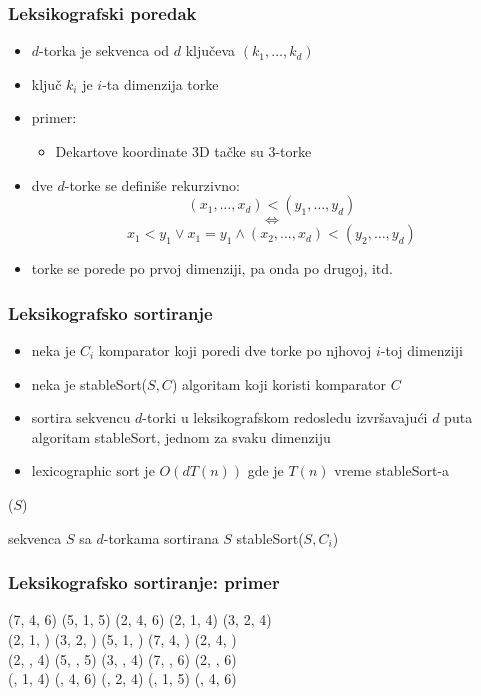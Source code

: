 \documentclass[compress,aspectratio=169]{beamer}
\begin{document}
\begin{frame}
  \frametitle{Leksikografski poredak}
  \begin{itemize}
    \item $d$-torka je sekvenca od $d$ ključeva $(k_1,\ldots,k_d)$
    \item ključ $k_i$ je $i$-ta dimenzija torke
    \item primer:
    \begin{itemize}
      \item Dekartove koordinate 3D tačke su 3-torke
    \end{itemize}
    \item {} dve $d$-torke se definiše rekurzivno:
    $$(x_1,\ldots,x_d) < (y_1,\ldots,y_d) $$
    $$\Leftrightarrow$$ 
    $$x_1 < y_1 \lor x_1 = y_1 \land (x_2,\ldots,x_d)<(y_2,\ldots,y_d)$$
    \item torke se porede po prvoj dimenziji, pa onda po drugoj, itd.
  \end{itemize}
\end{frame}

\begin{frame}
  \frametitle{Leksikografsko sortiranje}
  \begin{itemize}
    \item neka je $C_i$ komparator koji poredi dve torke po njhovoj $i$-toj dimenziji
    \item neka je stableSort($S, C$) algoritam koji koristi komparator $C$
    \item {} sortira sekvencu $d$-torki u leksikografskom redosledu izvršavajući $d$ puta algoritam stableSort, jednom za svaku dimenziju
    \item lexicographic sort je $O(dT(n))$ gde je $T(n)$ vreme stableSort-a
  \end{itemize}
($S$)
\begin{algorithmic}
\REQUIRE sekvenca $S$ sa $d$-torkama
\ENSURE sortirana $S$
  \STATE stableSort($S, C_i$)
\ENDFOR
\end{algorithmic}
\end{frame}

\begin{frame}
  \frametitle{Leksikografsko sortiranje: primer}
(7, 4, 6) (5, 1, 5) (2, 4, 6) (2, 1, 4) (3, 2, 4) \\
(2, 1, ) (3, 2, ) (5, 1, ) (7, 4, ) (2, 4, ) \\
(2, , 4) (5, , 5) (3, , 4) (7, , 6) (2, , 6) \\
(, 1, 4) (, 4, 6) (, 2, 4) (, 1, 5) (, 4, 6)
\end{frame}
\end{document}
